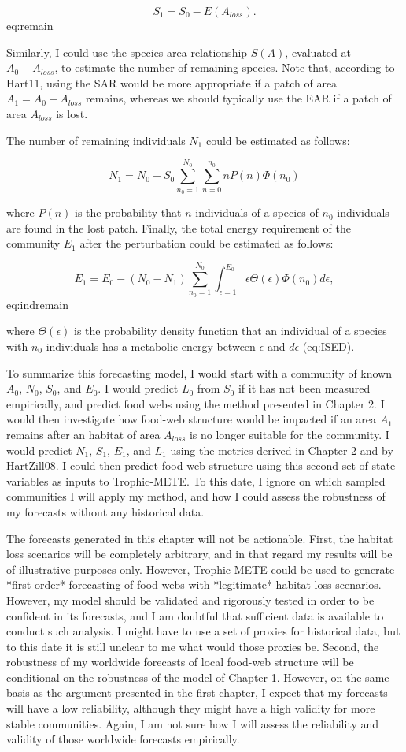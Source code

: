 $$S_1 = S_0 - E(A_{loss}).$${eq:remain}

Similarly, I could use the species-area relationship $S(A)$, evaluated at
$A_0-A_{loss}$, to estimate the number of remaining species. Note that,
according to Hart11, using the SAR would be more appropriate if a patch of area
$A_1 = A_0-A_{loss}$ remains, whereas we should typically use the EAR if a patch
of area $A_{loss}$ is lost.

The number of remaining individuals $N_1$ could be estimated as follows:

$$N_1 = N_0 -
S_0\sum_{n_0=1}^{N_0}\sum_{n=0}^{n_0}nP(n)\Phi(n_0)$$

where $P(n)$ is the probability that $n$ individuals of a species of $n_0$
individuals are found in the lost patch. Finally, the total energy requirement
of the community $E_1$ after the perturbation could be estimated as follows:

$$E_1 = E_0 -
(N_0-N_1)\sum_{n_0=1}^{N_0}\int_{\epsilon=1}^{E_0}\epsilon\Theta(\epsilon)\Phi(n_0)d\epsilon,$${eq:indremain}

where $\Theta(\epsilon)$ is the probability density function that an individual
of a species with $n_0$ individuals has a metabolic energy between $\epsilon$
and $d\epsilon$ (eq:ISED).

To summarize this forecasting model, I would start with a community of known
$A_0$, $N_0$, $S_0$, and $E_0$. I would predict $L_0$ from $S_0$ if it has not
been measured empirically, and predict food webs using the method presented in
Chapter 2. I would then investigate how food-web structure would be impacted if
an area $A_1$ remains after an habitat of area $A_{loss}$ is no longer suitable
for the community. I would predict $N_1$, $S_1$, $E_1$, and $L_1$ using the
metrics derived in Chapter 2 and by HartZill08. I could then predict food-web
structure using this second set of state variables as inputs to Trophic-METE. To
this date, I ignore on which sampled communities I will apply my method, and how
I could assess the robustness of my forecasts without any historical data.

The forecasts generated in this chapter will not be actionable. First, the
habitat loss scenarios will be completely arbitrary, and in that regard my
results will be of illustrative purposes only. However, Trophic-METE could be
used to generate *first-order* forecasting of food webs with *legitimate*
habitat loss scenarios. However, my model should be validated and rigorously
tested in order to be confident in its forecasts, and I am doubtful that
sufficient data is available to conduct such analysis. I might have to use a set
of proxies for historical data, but to this date it is still unclear to me what
would those proxies be. Second, the robustness of my worldwide forecasts of
local food-web structure will be conditional on the robustness of the model of
Chapter 1. However, on the same basis as the argument presented in the first
chapter, I expect that my forecasts will have a low reliability, although they
might have a high validity for more stable communities. Again, I am not sure how
I will assess the reliability and validity of those worldwide forecasts
empirically.


